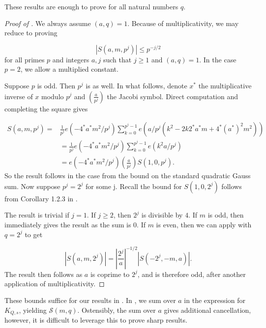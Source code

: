 \documentclass[11pt]{amsart}
\begin{document}
These results are enough to prove  for all natural numbers $q$.

\begin{proof}[Proof of ]
    We always assume $(a,q)=1$. Because of multiplicativity, we may reduce to proving

    \begin{equation*}
        |S(a,m,p^j)|\leq p^{-j/2}
    \end{equation*}
    for all primes $p$  and integers $a,j$ such that $j\geq 1$ and $(a,q)=1$. In the case $p=2$, we allow a multiplied constant.
    
    Suppose $p$ is odd. Then $p^j$ is as well. In what follows, denote $x^*$ the multiplicative inverse of $x$ modulo $p^j$ and $(\frac{a}{p^j})$ the Jacobi symbol. Direct computation and completing the square gives

    \begin{align*}
        S(a,m,p^j) = & \frac{1}{p^j}e(-4^*a^*m^2/p^j)\sum_{k=0}^{p^j-1}e(a/p^j(k^2-2k2^*a^*m+4^*(a^*)^2m^2))\\
        &=\frac{1}{p^j}e(-4^*a^*m^2/p^j)\sum_{k=0}^{p^j-1}e(k^2a/p^j)\\
        &= e(-4^*a^*m^2/p^j)(\frac{a}{p^j})S(1,0,p^j).
    \end{align*}
    So the result follows in the case from the bound on the standard quadratic Gauss sum. Now suppose $p^j = 2^j$ for some j. Recall the bound for $S(1,0,2^j)$ follows from Corollary 1.2.3 in \cite{GaussJacobiBook}.
    
    The result is trivial if $j=1$. If $j\geq 2$, then $2^j$ is divisible by $4$. If $m$ is odd, then  immediately gives the result as the sum is $0$. If $m$ is even, then we can apply  with $q=2^j$ to get

    \begin{equation*}
        |S(a,m,2^j)| = |\frac{2^j}{a}|^{-1/2}|S(-2^j,-m,a)|.
    \end{equation*}
    The result then follows as $a$ is coprime to $2^j$, and is therefore odd, after another application of multiplicativity. 
\end{proof}
These bounds suffice for our results in . In , we sum over $a$ in the expression for $K_{Q,s}$, yielding $\mathcal{S}(m,q)$. Ostensibly, the sum over $a$ gives additional cancellation, however, it is difficult to leverage this to prove sharp results.
\end{document}
